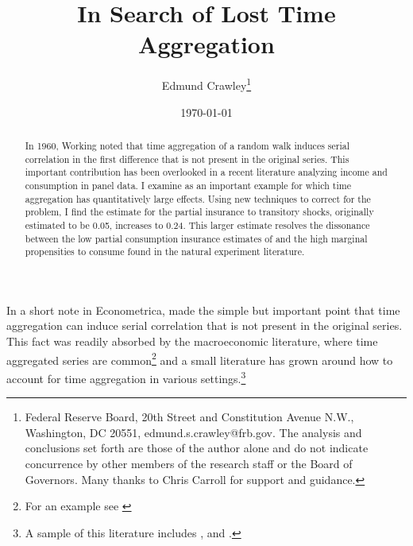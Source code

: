 \documentclass[AER]{AEA}
\begin{document}
\title{In Search of Lost Time Aggregation}
\author{Edmund Crawley\thanks{ Federal Reserve Board, 20th Street and Constitution Avenue N.W., Washington, DC 20551, edmund.s.crawley@frb.gov. The analysis and conclusions set forth are those of the author alone and do not indicate concurrence by other members of the research staff or the Board of Governors. Many thanks to Chris Carroll for support and guidance.}}
\date{\today}
\pubVolume{}
\pubIssue{}

\begin{abstract}
In 1960, Working noted that time aggregation of a random walk induces serial correlation in the first difference that is not present in the original series. This important contribution has been overlooked in a recent literature analyzing income and consumption in panel data. I examine \cite{blundell_consumption_2008} as an important example for which time aggregation has quantitatively large effects. Using new techniques to correct for the problem, I find the estimate for the partial insurance to transitory shocks, originally estimated to be 0.05, increases to 0.24. This larger estimate resolves the dissonance between the low partial consumption insurance estimates of \cite{blundell_consumption_2008} and the high marginal propensities to consume found in the natural experiment literature.
\end{abstract}


\maketitle

\newpage
In a short note in Econometrica, \cite{working_note_1960} made the simple but important point that time aggregation can induce serial correlation that is not present in the original series. This fact was readily absorbed by the macroeconomic literature, where time aggregated series are common\footnote{For an example see \cite{campbell_consumption_1989}} and a small literature has grown around how to account for time aggregation in various settings.\footnote{A sample of this literature includes \cite{amemiya_effect_1972}, \cite{weiss_systematic_1984} and \cite{drost_temporal_1993}.}
\end{document}
